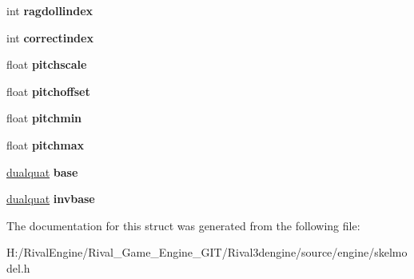 \begin{DoxyCompactItemize}
int {\bfseries ragdollindex}
\item 
\mbox{\label{structskelmodel_1_1boneinfo_a4ffc5130c8f712e89c0756a4fa70b3ba}} 
int {\bfseries correctindex}
\item 
\mbox{\label{structskelmodel_1_1boneinfo_a5fc8ea4cbcd7dee23ef4d6f301013248}} 
float {\bfseries pitchscale}
\item 
\mbox{\label{structskelmodel_1_1boneinfo_a4d33ef11f15c6030d760cfbaa183ee7a}} 
float {\bfseries pitchoffset}
\item 
\mbox{\label{structskelmodel_1_1boneinfo_abce2d8858e3c1eb479d0d891da5e0ff8}} 
float {\bfseries pitchmin}
\item 
\mbox{\label{structskelmodel_1_1boneinfo_a46422d32c2a95ee3f0eb30202ba3bdcd}} 
float {\bfseries pitchmax}
\item 
\mbox{\label{structskelmodel_1_1boneinfo_a7515ba7fe742ddad1f3d10f9b879f9c0}} 
\hyperlink{structdualquat}{dualquat} {\bfseries base}
\item 
\mbox{\label{structskelmodel_1_1boneinfo_a0ab86759a52bd130b02feb11d7451a5a}} 
\hyperlink{structdualquat}{dualquat} {\bfseries invbase}
\end{DoxyCompactItemize}


The documentation for this struct was generated from the following file\+:\begin{DoxyCompactItemize}
\item 
H\+:/\+Rival\+Engine/\+Rival\+\_\+\+Game\+\_\+\+Engine\+\_\+\+G\+I\+T/\+Rival3dengine/source/engine/skelmodel.\+h\end{DoxyCompactItemize}
